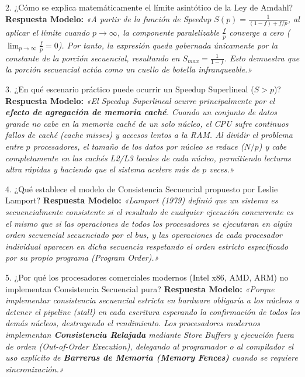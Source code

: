 \documentclass[11pt,a4paper]{article}
\begin{document}
\begin{qabox}{2. ¿Cómo se explica matemáticamente el límite asintótico de la Ley de Amdahl?}
\textbf{Respuesta Modelo:}  
\textit{«A partir de la función de Speedup $S(p) = \frac{1}{(1-f) + f/p}$, al aplicar el límite cuando $p \to \infty$, la componente paralelizable $\frac{f}{p}$ converge a cero ($\lim_{p \to \infty} \frac{f}{p} = 0$). Por tanto, la expresión queda gobernada únicamente por la constante de la porción secuencial, resultando en $S_{max} = \frac{1}{1-f}$. Esto demuestra que la porción secuencial actúa como un cuello de botella infranqueable.»}
\end{qabox}

\begin{qabox}{3. ¿En qué escenario práctico puede ocurrir un Speedup Superlineal ($S > p$)?}
\textbf{Respuesta Modelo:}  
\textit{«El Speedup Superlineal ocurre principalmente por el \textbf{efecto de agregación de memoria caché}. Cuando un conjunto de datos grande no cabe en la memoria caché de un solo núcleo, el CPU sufre continuos fallos de caché (cache misses) y accesos lentos a la RAM. Al dividir el problema entre $p$ procesadores, el tamaño de los datos por núcleo se reduce ($N/p$) y cabe completamente en las cachés L2/L3 locales de cada núcleo, permitiendo lecturas ultra rápidas y haciendo que el sistema acelere más de $p$ veces.»}
\end{qabox}

\begin{qabox}{4. ¿Qué establece el modelo de Consistencia Secuencial propuesto por Leslie Lamport?}
\textbf{Respuesta Modelo:}  
\textit{«Lamport (1979) definió que un sistema es secuencialmente consistente si el resultado de cualquier ejecución concurrente es el mismo que si las operaciones de todos los procesadores se ejecutaran en algún orden secuencial secuenciado por el bus, y las operaciones de cada procesador individual aparecen en dicha secuencia respetando el orden estricto especificado por su propio programa (Program Order).»}
\end{qabox}

\begin{qabox}{5. ¿Por qué los procesadores comerciales modernos (Intel x86, AMD, ARM) no implementan Consistencia Secuencial pura?}
\textbf{Respuesta Modelo:}  
\textit{«Porque implementar consistencia secuencial estricta en hardware obligaría a los núcleos a detener el pipeline (stall) en cada escritura esperando la confirmación de todos los demás núcleos, destruyendo el rendimiento. Los procesadores modernos implementan \textbf{Consistencia Relajada} mediante Store Buffers y ejecución fuera de orden (\textit{Out-of-Order Execution}), delegando al programador o al compilador el uso explícito de \textbf{Barreras de Memoria (Memory Fences)} cuando se requiere sincronización.»}
\end{qabox}
\end{document}
